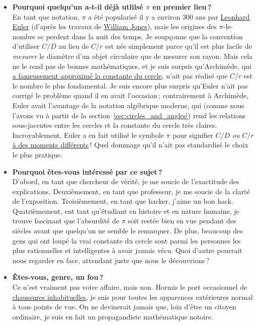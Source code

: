\begin{itemize}
  \item \textbf{Pourquoi quelqu'un a-t-il déjà utlilsé $\pi$ en premier lieu\,?} \\ En tant que notation, $\pi$ a été popularisé il y a environ 300 ans par \href{https://fr.wikipedia.org/wiki/Leonhard_Euler}{Leonhard Euler} (d'après les travaux de \href{https://fr.wikipedia.org/wiki/William_Jones_(mathématicien)}{William Jones}), mais les origines des $\pi$-le-nombre se perdent dans la nuit des temps. Je soupçonne que la convention d'utiliser $C/D$ au lieu de $C/r$ est née simplement parce qu'il est plus facile de \emph{mesurer} le diamètre d'un objet circulaire que de mesurer son rayon. Mais cela ne le rend pas de bonnes mathématiques, et je suis surpris qu'Archimède, qui \href{http://itech.fgcu.edu/faculty/clindsey/mhf4404/archimedes/archimedes.html}{a fameusement approximé la constante du cercle}, n'ait pas réalisé que $C/r$ est le nombre le plus fondamental. Je suis encore plus surpris qu'Euler n'ait pas corrigé le problème quand il en avait l'occasion\,; contrairement à Archimède, Euler avait l'avantage de la notation algébrique moderne, qui (comme nous l'avons vu à partir de la section~\ref{sec:circles_and_angles}) rend les relations sous-jacentes entre les cercles et la constante du cercle très claires. Incroyablement, Euler a en fait utilisé le symbole $\pi$ pour signifier $C/D$ \emph{ou} $C/r$ \href{https://bit.ly/2OERR3G}{à des moments différents}\,! Quel dommage qu'il n'ait pas standardisé le choix le plus pratique.

  \item \textbf{Pourquoi êtes-vous intéressé par ce sujet\,?} \\ D'abord, en tant que chercheur de vérité, je me soucie de l'exactitude des explications. Deuxièmement, en tant que professeur, je me soucie de la clarté de l'exposition. Troisièmement, en tant que hacker, j'aime un bon hack. Quatrièmement, ent tant qu'étudiant en histoire et en nature humaine, je trouve fascinant que l'absurdité de $\pi$ soit restée bien en vue pendant des siècles avant que quelqu'un ne semble le remarquer. De plus, beaucoup des gens qui ont loupé la vrai constante du cercle sont parmi les personnes les plus rationnelles et intelligentes à avoir jamais vécu. Quoi d'autre pourrait nous regarder en face, attendant juste que nous le découvrions\,?

  \item \textbf{Êtes-vous, genre, un fou\,?} \\ Ce n'est vraiment pas votre affaire, mais non. Hormis le port occasionnel de \href{https://fr.wikipedia.org/wiki/Chaussure_à_orteils}{chaussures inhabituelles}, je suis pour toutes les apparences extérieures normal à tous points de vue. On ne devinerait jamais que, loin d'être un citoyen ordinaire, je suis en fait un propagandiste mathématique notoire.


\end{itemize}
